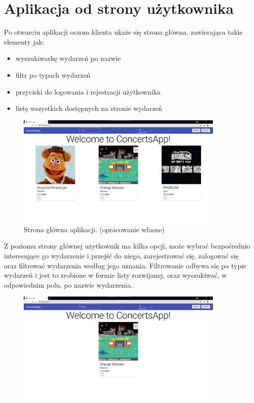 \documentclass[12pt]{article}
\begin{document}
\begin{sloppypar}
\section{Aplikacja od strony użytkownika}
{
  Po otwarciu aplikacji oczom klienta ukaże się strona główna, zawierająca takie elementy jak:
  \begin{itemize}
    \item wyszukiwarkę wydarzeń po nazwie
    \item filtr po typach wydarzeń
    \item przyciski do logowania i rejestracji użytkownika
    \item listę wszystkich dostępnych na stronie wydarzeń
  \end{itemize}
  \begin{figure}[H]
    \centering
    \includegraphics[width=0.9\textwidth]{client_app/home.png}
    \caption{Strona główna aplikacji. (opracowanie własne)}
    \label{fig:home-page}
  \end{figure}
  Z poziomu strony głównej użytkownik ma kilka opcji, może wybrać bezpośrednio interesujące go wydarzenie i przejść do niego, zarejestrować się, 
  zalogować się oraz filtrować wydarzenia według jego uznania. 
  Filtrowanie odbywa się po typie wydarzeń i jest to zrobione w formie listy rozwijanej, oraz wyszukiwać, w odpowiednim polu, po nazwie wydarzenia.
  \begin{figure}[H]
    \centering
    \includegraphics[width=0.9\textwidth]{client_app/search.png}

\end{figure}}
\end{sloppypar}
\end{document}
